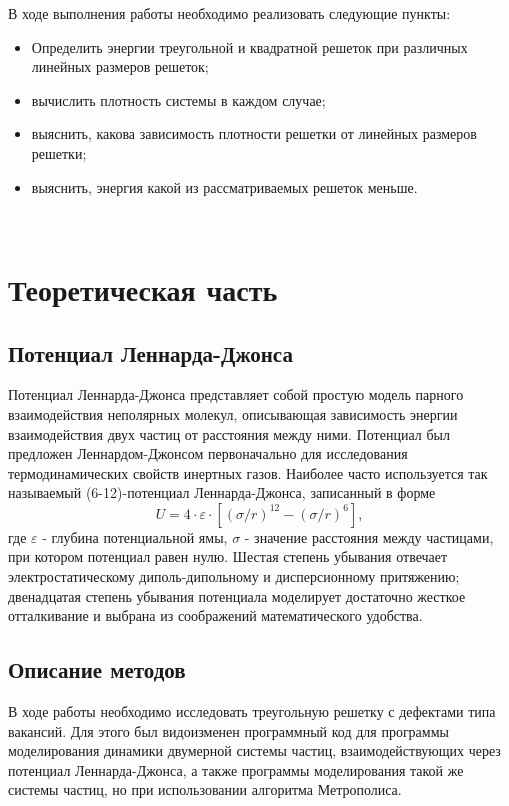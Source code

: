 \documentclass[14pt,a4paper,report]{ncc}
\begin{document}
В ходе выполнения работы необходимо реализовать следующие пункты:
\begin{itemize}
\item Определить энергии треугольной и квадратной решеток при различных линейных размеров решеток;
\item вычислить плотность системы в каждом случае;
\item выяснить, какова зависимость плотности решетки от линейных размеров решетки;
\item выяснить, энергия какой из рассматриваемых решеток меньше.
\end{itemize}

\

\newpage\section{Теоретическая часть }
\subsection{Потенциал Леннарда-Джонса}
Потенциал Леннарда-Джонса представляет собой простую модель парного взаимодействия неполярных молекул, описывающая зависимость энергии взаимодействия двух частиц от расстояния между ними.
Потенциал был предложен Леннардом-Джонсом первоначально для исследования термодинамических свойств инертных газов. Наиболее часто используется так называемый (6-12)-потенциал Леннарда-Джонса, записанный в форме 
\
\begin{equation}
 U = 4 \cdot \varepsilon \cdot [(\sigma/r)^{12} - (\sigma/r)^{6}  ] ,
 \end{equation} 
где $\varepsilon$ - глубина потенциальной ямы, $\sigma$ - значение расстояния между частицами, при котором потенциал равен нулю. Шестая степень убывания отвечает электростатическому диполь-дипольному и дисперсионному притяжению; двенадцатая степень убывания потенциала моделирует достаточно жесткое отталкивание и выбрана из соображений математического удобства.
\



\newpage
\subsection{Описание  методов}
В ходе работы необходимо исследовать треугольную решетку с дефектами типа вакансий. Для этого был видоизменен программный код для программы моделирования динамики двумерной системы частиц, взаимодействующих через потенциал Леннарда-Джонса, а также программы моделирования такой же системы частиц, но при использовании алгоритма Метрополиса.
\
\end{document}
